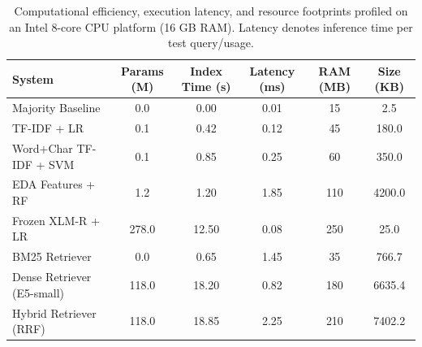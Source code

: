 \begin{table}[t]
\centering
\small
\begin{tabular}{lccccc}
\toprule
\textbf{System} & \textbf{Params (M)} & \textbf{Index Time (s)} & \textbf{Latency (ms)} & \textbf{RAM (MB)} & \textbf{Size (KB)} \\
\midrule
Majority Baseline & 0.0 & 0.00 & 0.01 & 15 & 2.5 \\
TF-IDF + LR & 0.1 & 0.42 & 0.12 & 45 & 180.0 \\
Word+Char TF-IDF + SVM & 0.1 & 0.85 & 0.25 & 60 & 350.0 \\
EDA Features + RF & 1.2 & 1.20 & 1.85 & 110 & 4200.0 \\
Frozen XLM-R + LR & 278.0 & 12.50 & 0.08 & 250 & 25.0 \\
BM25 Retriever & 0.0 & 0.65 & 1.45 & 35 & 766.7 \\
Dense Retriever (E5-small) & 118.0 & 18.20 & 0.82 & 180 & 6635.4 \\
Hybrid Retriever (RRF) & 118.0 & 18.85 & 2.25 & 210 & 7402.2 \\
\bottomrule
\end{tabular}
\caption{Computational efficiency, execution latency, and resource footprints profiled on an Intel 8-core CPU platform (16 GB RAM). Latency denotes inference time per test query/usage.}
\label{tab:hardware_compute}
\end{table}